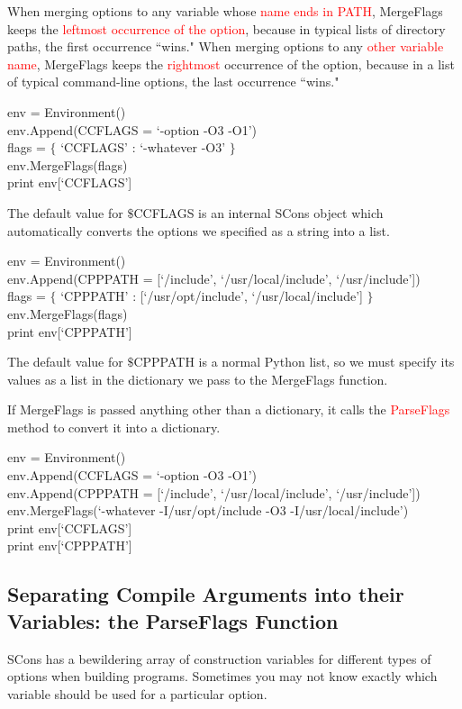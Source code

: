 \documentclass[12pt,a4paper]{article}
\begin{document}
When merging options to any variable whose \textcolor{red}{name ends in PATH}, MergeFlags keeps the \textcolor{red}{leftmost occurrence of the option}, because in typical lists of directory paths, the first occurrence ``wins." When merging options to any \textcolor{red}{other variable name}, MergeFlags keeps the \textcolor{red}{rightmost} occurrence of the option, because in a list of typical command-line options, the last occurrence ``wins."

env = Environment() \\
env.Append(CCFLAGS = `-option -O3 -O1') \\
flags = $\{$ `CCFLAGS' : `-whatever -O3' $\}$ \\
env.MergeFlags(flags) \\
print env[`CCFLAGS']

The default value for $\$$CCFLAGS is an internal SCons object which automatically converts the options we specified as a string into a list.

env = Environment() \\
env.Append(CPPPATH = [`/include', `/usr/local/include', `/usr/include']) \\
flags = $\{$ `CPPPATH' : [`/usr/opt/include', `/usr/local/include'] $\}$ \\
env.MergeFlags(flags) \\
print env[`CPPPATH']

The default value for $\$$CPPPATH is a normal Python list, so we must specify its values as a list in the dictionary we pass to the MergeFlags function.

If MergeFlags is passed anything other than a dictionary, it calls the \textcolor{red}{ParseFlags} method to convert it into a dictionary.

env = Environment() \\
env.Append(CCFLAGS = `-option -O3 -O1') \\
env.Append(CPPPATH = [`/include', `/usr/local/include', `/usr/include']) \\
env.MergeFlags(`-whatever -I/usr/opt/include -O3 -I/usr/local/include') \\
print env[`CCFLAGS'] \\
print env[`CPPPATH']


\subsection{Separating Compile Arguments into their Variables: the ParseFlags Function}
SCons has a bewildering array of construction variables for different types of options when building programs. Sometimes you may not know exactly which variable should be used for a particular option.
\end{document}

